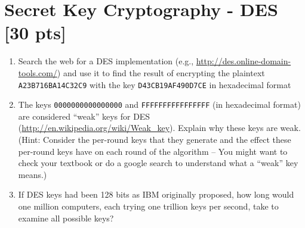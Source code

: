 \documentclass[11pt]{article}
\begin{document}
\section{Secret Key Cryptography - DES [30 pts]}
\begin{enumerate}
\item Search the web for a DES implementation (e.g.,  \url{http://des.online-domain-tools.com/}) and use it to find the result of encrypting the plaintext {\tt A23B716BA14C32C9} with the key {\tt D43CB19AF490D7CE} in hexadecimal format
\item The keys {\tt 0000000000000000} and {\tt FFFFFFFFFFFFFFFF} (in hexadecimal format) are considered ``weak'' keys for DES (\url{http://en.wikipedia.org/wiki/Weak_key}). Explain why these keys are weak. (Hint: Consider the per-round keys that they generate and the effect these per-round keys have on each round of the algorithm --  You might want to check your textbook or do a google search to understand what a  ``weak'' key means.)
\item If DES keys had been 128 bits as IBM originally proposed, how long would one million computers, each trying one trillion keys per second, take to examine all possible keys?
\end{enumerate}

 
\vspace{0.5in}
\end{document}
